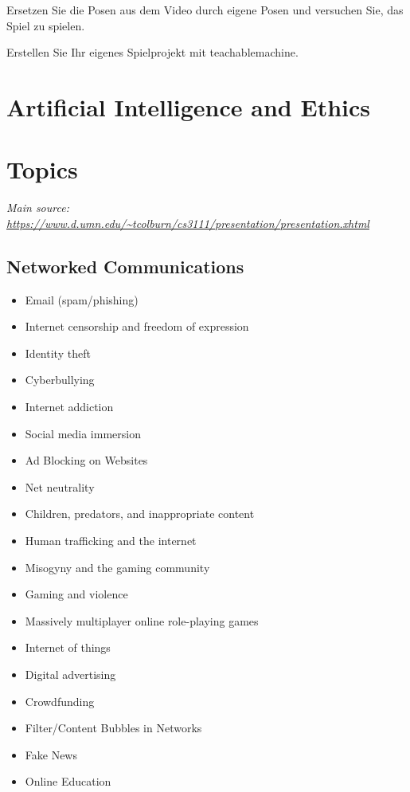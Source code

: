 \documentclass[12pt,a4paper]{report}
\begin{document}
\begin{ex}
     Ersetzen Sie die Posen aus dem Video durch eigene Posen und versuchen Sie, das Spiel zu spielen.
\end{ex}

\begin{ex}
    Erstellen Sie Ihr eigenes Spielprojekt mit teachablemachine.
\end{ex}


\newpage



\section*{Artificial Intelligence and Ethics}





\section*{Topics}
\emph{Main source: \url{https://www.d.umn.edu/~tcolburn/cs3111/presentation/presentation.xhtml}}
\subsection*{Networked Communications}
\begin{itemize}
\item Email (spam/phishing)
\item Internet censorship and freedom of expression
\item Identity theft
\item Cyberbullying
\item Internet addiction
\item Social media immersion
\item Ad Blocking on Websites
\item Net neutrality
\item Children, predators, and inappropriate content
\item Human trafficking and the internet
\item Misogyny and the gaming community
\item Gaming and violence
\item Massively multiplayer online role-playing games
\item Internet of things
\item Digital advertising
\item Crowdfunding
\item Filter/Content Bubbles in Networks
\item Fake News
\item Online Education
\end{itemize}
\end{document}
